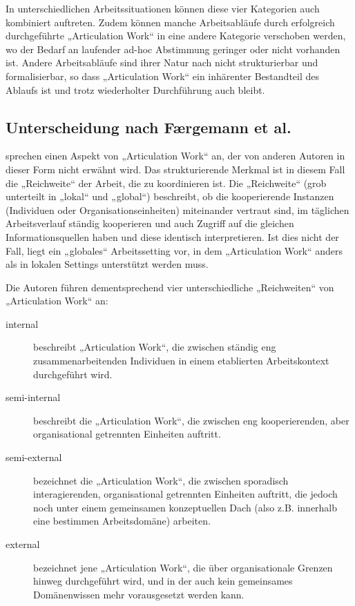 In unterschiedlichen Arbeitssituationen können diese vier Kategorien auch kombiniert auftreten. Zudem können manche Arbeitsabläufe durch erfolgreich durchgeführte „Articulation Work“ in eine andere Kategorie verschoben werden, wo der Bedarf an laufender ad-hoc Abstimmung geringer oder nicht vorhanden ist. Andere Arbeitsabläufe sind ihrer Natur nach nicht strukturierbar und formalisierbar, so dass „Articulation Work“ ein inhärenter Bestandteil des Ablaufs ist und trotz wiederholter Durchführung auch bleibt.

\subsection{Unterscheidung nach Færgemann et al.} %
\label{sub:unterscheidung_nach_færgemann_et_al_}

\citet{Faergemann05} sprechen einen Aspekt von „Articulation Work“ an, der von anderen Autoren in dieser Form nicht erwähnt wird. Das strukturierende Merkmal ist in diesem Fall die „Reichweite“ der Arbeit, die zu koordinieren ist. Die „Reichweite“ (grob unterteilt in „lokal“ und „global“) beschreibt, ob die kooperierende Instanzen (Individuen oder Organisationseinheiten) miteinander vertraut sind, im täglichen Arbeitsverlauf ständig kooperieren und auch Zugriff auf die gleichen Informationsquellen haben und diese identisch interpretieren. Ist dies nicht der Fall, liegt ein „globales“ Arbeitssetting vor, in dem „Articulation Work“ anders als in lokalen Settings unterstützt werden muss.

Die Autoren führen dementsprechend vier unterschiedliche „Reichweiten“ von „Articulation Work“ an:
\begin{description}
	\item[internal] beschreibt „Articulation Work“, die zwischen ständig eng zusammenarbeitenden Individuen in einem etablierten Arbeitskontext durchgeführt wird.
	\item[semi-internal] beschreibt die „Articulation Work“, die zwischen eng kooperierenden, aber organisational getrennten Einheiten auftritt.
	\item[semi-external] bezeichnet die „Articulation Work“, die zwischen sporadisch interagierenden, organisational getrennten Einheiten auftritt, die jedoch noch unter einem gemeinsamen konzeptuellen Dach (also z.B. innerhalb eine bestimmen Arbeitsdomäne) arbeiten.
	\item[external] bezeichnet jene „Articulation Work“, die über organisationale Grenzen hinweg durchgeführt wird, und in der auch kein gemeinsames Domänenwissen mehr vorausgesetzt werden kann.
\end{description}

